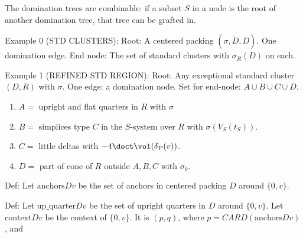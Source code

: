 The domination trees are combinable: if a subset $S$ in a node is
the root of another domination tree, that tree can be grafted in.

Example 0 (STD CLUSTERS): Root: A centered packing
$(\sigma,\ring{D},D)$. One domination edge. End node: The set of
standard clusters with $\sigma_R(D)$ on each.

Example 1 (REFINED STD REGION):
Root: Any exceptional standard cluster $(D,R)$ with $\sigma$.
One edge:  a domination node.
Set for end-node: $A \cup B \cup C \cup D$.
   \begin{enumerate}
   \item $ A = $ upright and flat quarters in $R$ with $\sigma$
   \item $ B = $ simplices type $C$ in the $S$-system over $R$ with $\sigma(V_S(t_S))$.
   \item $ C = $ little deltas with $-4\doct \vol(\delta_P(v))$.
   \item $ D = $ part of cone of $R$ outside $A,B,C$ with $\sigma_0$.
   \end{enumerate}

Def: Let $\text{anchors} D v$ be the set of anchors in centered
packing $D$ around $\{0,v\}$.

Def: Let $\text{up\_quarter} D v$ be the set of upright quarters in $D$
around $\{0,v\}$.  Let $\text{context} D v$ be the context of $\{0,v\}$.
It is $(p,q)$, where $p = CARD(\text{anchors}D v)$, and

